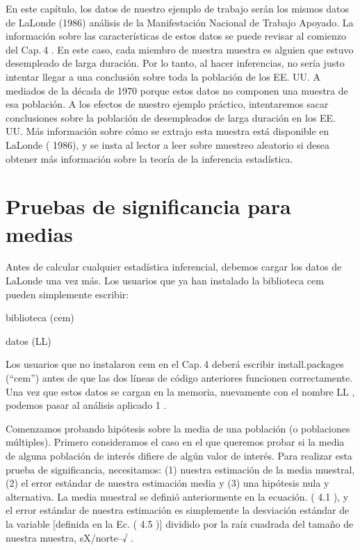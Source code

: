 \documentclass[
]{book}
\begin{document}
En este capítulo, los datos de nuestro ejemplo de trabajo serán los mismos datos de LaLonde (1986) análisis de la Manifestación Nacional de Trabajo Apoyado. La información sobre las características de estos datos se puede revisar al comienzo del Cap. 4 . En este caso, cada miembro de nuestra muestra es alguien que estuvo desempleado de larga duración. Por lo tanto, al hacer inferencias, no sería justo intentar llegar a una conclusión sobre toda la población de los EE. UU. A mediados de la década de 1970 porque estos datos no componen una muestra de esa población. A los efectos de nuestro ejemplo práctico, intentaremos sacar conclusiones sobre la población de desempleados de larga duración en los EE. UU. Más información sobre cómo se extrajo esta muestra está disponible en LaLonde ( 1986), y se insta al lector a leer sobre muestreo aleatorio si desea obtener más información sobre la teoría de la inferencia estadística.

\hypertarget{pruebas-de-significancia-para-medias}{%
\section*{Pruebas de significancia para medias}\label{pruebas-de-significancia-para-medias}}

Antes de calcular cualquier estadística inferencial, debemos cargar los datos de LaLonde una vez más. Los usuarios que ya han instalado la biblioteca cem pueden simplemente escribir:

biblioteca (cem)

datos (LL)

Los usuarios que no instalaron cem en el Cap. 4 deberá escribir install.packages (``cem'') antes de que las dos líneas de código anteriores funcionen correctamente. Una vez que estos datos se cargan en la memoria, nuevamente con el nombre LL , podemos pasar al análisis aplicado 1 .

Comenzamos probando hipótesis sobre la media de una población (o poblaciones múltiples). Primero consideramos el caso en el que queremos probar si la media de alguna población de interés difiere de algún valor de interés. Para realizar esta prueba de significancia, necesitamos: (1) nuestra estimación de la media muestral, (2) el error estándar de nuestra estimación media y (3) una hipótesis nula y alternativa. La media muestral se definió anteriormente en la ecuación. ( 4.1 ), y el error estándar de nuestra estimación es simplemente la desviación estándar de la variable {[}definida en la Ec. ( 4.5 ){]} dividido por la raíz cuadrada del tamaño de nuestra muestra, sX/norte--√ .
\end{document}
